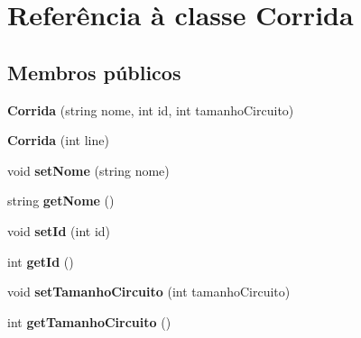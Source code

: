 \hypertarget{classCorrida}{}\section{Referência à classe Corrida}
\label{classCorrida}
\subsection*{Membros públicos}
\begin{DoxyCompactItemize}
\item 
{\bfseries Corrida} (string nome, int id, int tamanho\+Circuito)\hypertarget{classCorrida_ada090d12a7b7b6713490ba6a7db8b71c}{}\label{classCorrida_ada090d12a7b7b6713490ba6a7db8b71c}

\item 
{\bfseries Corrida} (int line)\hypertarget{classCorrida_ade85fcd07d8f3d727cf4ebfbe44d5dca}{}\label{classCorrida_ade85fcd07d8f3d727cf4ebfbe44d5dca}

\item 
void {\bfseries set\+Nome} (string nome)\hypertarget{classCorrida_a99faffae20dd11537bce0cd14e301ae2}{}\label{classCorrida_a99faffae20dd11537bce0cd14e301ae2}

\item 
string {\bfseries get\+Nome} ()\hypertarget{classCorrida_ab7c7d0b93664700283593b2f8c5bb530}{}\label{classCorrida_ab7c7d0b93664700283593b2f8c5bb530}

\item 
void {\bfseries set\+Id} (int id)\hypertarget{classCorrida_a7c3f85aa7474108f306cd706a7e466c4}{}\label{classCorrida_a7c3f85aa7474108f306cd706a7e466c4}

\item 
int {\bfseries get\+Id} ()\hypertarget{classCorrida_a1aaef16d1834caad18efbbe552ca3451}{}\label{classCorrida_a1aaef16d1834caad18efbbe552ca3451}

\item 
void {\bfseries set\+Tamanho\+Circuito} (int tamanho\+Circuito)\hypertarget{classCorrida_a401df28afac607d788a403b72c632a5e}{}\label{classCorrida_a401df28afac607d788a403b72c632a5e}

\item 
int {\bfseries get\+Tamanho\+Circuito} ()\hypertarget{classCorrida_add6152589fc777d0d1f2e8d1665b8b2b}{}\label{classCorrida_add6152589fc777d0d1f2e8d1665b8b2b}

\end{DoxyCompactItemize}
